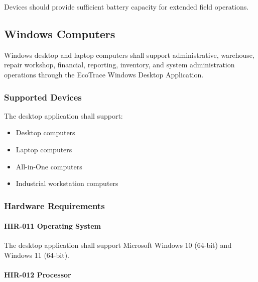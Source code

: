 Devices should provide sufficient battery capacity for extended field
operations.


\subsection{Windows Computers}

Windows desktop and laptop computers shall support administrative,
warehouse, repair workshop, financial, reporting, inventory, and system
administration operations through the EcoTrace Windows Desktop
Application.


\subsubsection*{Supported Devices}

The desktop application shall support:

\begin{itemize}

\item Desktop computers

\item Laptop computers

\item All-in-One computers

\item Industrial workstation computers

\end{itemize}


\subsubsection*{Hardware Requirements}

\paragraph{HIR-011 Operating System}

The desktop application shall support Microsoft Windows 10 (64-bit) and
Windows 11 (64-bit).

\paragraph{HIR-012 Processor}

